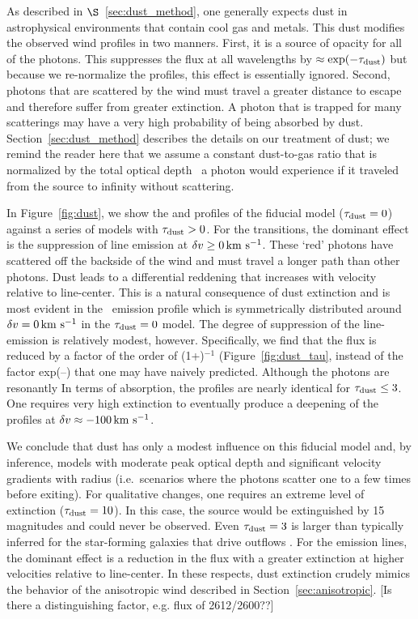 \documentclass[12pt,preprint]{aastex}
\begin{document}
As described in $\S$~\ref{sec:dust_method}, 
one generally expects dust in astrophysical environments that contain
cool gas and metals.  This dust 
modifies the observed wind profiles in two manners. 
First, it is a source of opacity for all of 
the photons.  This suppresses the flux at all
wavelengths by $\approx \exp(-\tau_{\rm dust})$ but because we re-normalize the
profiles, this effect is essentially ignored.  Second, photons that are
scattered by the wind must travel a greater
distance to escape and therefore suffer from greater extinction.  A photon that is
trapped for many scatterings may have a very high probability of being absorbed
by dust.  
Section~\ref{sec:dust_method} describes the details on our treatment of dust; we 
remind the reader here that we assume a constant dust-to-gas ratio 
that is normalized by the total optical
depth \taud\ a photon would experience if it traveled from the
source to infinity without scattering. 

In Figure~\ref{fig:dust}, we show the  and 
profiles of the fiducial model ($\tau_{\rm dust} = 0$) against a series of
models with $\tau_{\rm dust} > 0$.  For the  transitions, the
dominant effect is the suppression of line emission at $\delta v \ge 0
\, {\rm km~s^{-1}}$.  These `red' photons have scattered off the
backside of the wind and must travel a longer path than other
photons.  Dust leads to a differential reddening that increases with 
velocity relative to line-center. This is a natural consequence of dust
extinction and is most evident in the \feiic\ 
emission profile which is symmetrically distributed around
$\delta v= 0 \, {\rm km~s^{-1}}$ in the $\tau_{\rm dust}=0$ model.   
The degree of suppression of the line-emission is relatively modest,
however.  Specifically, we find that the flux is reduced by a factor 
of the order of (1+\taud)$^{-1}$ (Figure~\ref{fig:dust_tau},
instead of the factor
exp(--\taud) that one may have naively predicted. 
Although the  photons are resonantly
In terms of absorption, the profiles are
nearly identical for $\tau_{\rm dust} \le 3$.  One requires very high
extinction to eventually produce a deepening of the profiles at 
$\delta v \approx -100 \, {\rm km~s^{-1}}$.

We conclude that dust has only a modest influence on this fiducial model and,
by inference, models with moderate peak optical depth and
significant velocity gradients with radius (i.e.\ scenarios where the
photons scatter one to a few times before exiting).
For qualitative changes, one requires an extreme level of
extinction ($\tau_{\rm dust} = 10$).  In this case, the source would be
extinguished by 15\,magnitudes and could never be observed. 
Even $\tau_{\rm dust} = 3$ is larger than typically inferred for the
star-forming galaxies that drive outflows \citep[e.g.][]{dust}.
For the emission lines,
the dominant effect is a reduction in the flux 
with a greater extinction at higher velocities relative to line-center.
In these respects, dust extinction crudely mimics the behavior of the
anisotropic
wind described in Section~\ref{sec:anisotropic}. [Is there a
distinguishing factor, e.g. flux of 2612/2600??]
\end{document}
